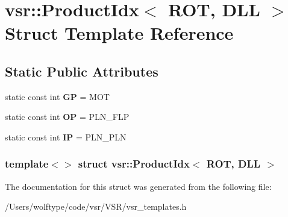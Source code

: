 \hypertarget{structvsr_1_1_product_idx_3_01_r_o_t_00_01_d_l_l_01_4}{\section{vsr\-:\-:Product\-Idx$<$ R\-O\-T, D\-L\-L $>$ Struct Template Reference}
\label{structvsr_1_1_product_idx_3_01_r_o_t_00_01_d_l_l_01_4}
}
\subsection*{Static Public Attributes}
\begin{DoxyCompactItemize}
\item 
\hypertarget{structvsr_1_1_product_idx_3_01_r_o_t_00_01_d_l_l_01_4_ae0f696e2420b6b93adfbdcf8bd10c736}{static const int {\bfseries G\-P} = M\-O\-T}\label{structvsr_1_1_product_idx_3_01_r_o_t_00_01_d_l_l_01_4_ae0f696e2420b6b93adfbdcf8bd10c736}

\item 
\hypertarget{structvsr_1_1_product_idx_3_01_r_o_t_00_01_d_l_l_01_4_ac9056d4e5280c2e17c79c1ff27eaa5ce}{static const int {\bfseries O\-P} = P\-L\-N\-\_\-\-F\-L\-P}\label{structvsr_1_1_product_idx_3_01_r_o_t_00_01_d_l_l_01_4_ac9056d4e5280c2e17c79c1ff27eaa5ce}

\item 
\hypertarget{structvsr_1_1_product_idx_3_01_r_o_t_00_01_d_l_l_01_4_ab7d6ec0666a46c6c60dadeb29ca3cb2e}{static const int {\bfseries I\-P} = P\-L\-N\-\_\-\-P\-L\-N}\label{structvsr_1_1_product_idx_3_01_r_o_t_00_01_d_l_l_01_4_ab7d6ec0666a46c6c60dadeb29ca3cb2e}

\end{DoxyCompactItemize}
\subsubsection*{template$<$$>$ struct vsr\-::\-Product\-Idx$<$ R\-O\-T, D\-L\-L $>$}



The documentation for this struct was generated from the following file\-:\begin{DoxyCompactItemize}
\item 
/\-Users/wolftype/code/vsr/\-V\-S\-R/vsr\-\_\-templates.\-h\end{DoxyCompactItemize}
